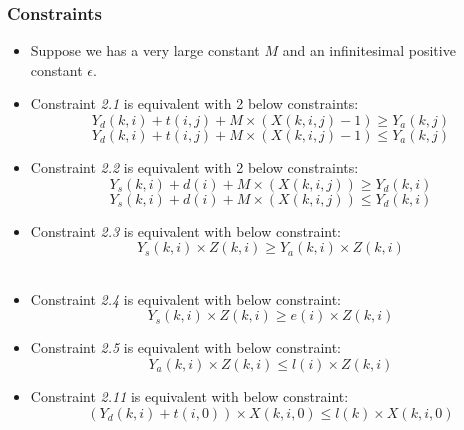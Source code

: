 \subsubsection{Constraints}
	\begin{itemize}
		\item Suppose we has a very large constant $M$ and an infinitesimal positive constant $\epsilon$.
		\item Constraint \emph{2.1} is equivalent with 2 below constraints:
		\begin{equation}
			Y_{d}(k, i) + t(i, j) + M \times (X(k, i, j) - 1) \geq Y_{a}(k, j)
		\end{equation}
		\begin{equation}
			Y_{d}(k, i) + t(i, j) + M \times (X(k, i, j) - 1) \leq Y_{a}(k, j)
		\end{equation}
		\item Constraint \emph{2.2} is equivalent with 2 below constraints:
		\begin{equation}
			Y_{s}(k, i) + d(i) + M \times (X(k, i, j)) \geq Y_{d}(k, i)
		\end{equation}
		\begin{equation}
			Y_{s}(k, i) + d(i) + M \times (X(k, i, j)) \leq Y_{d}(k, i)
		\end{equation}
		\item Constraint \emph{2.3} is equivalent with below constraint:
		\begin{equation}
			Y_{s}(k, i) \times Z(k, i) \geq Y_{a}(k, i) \times Z(k, i) 
		\end{equation}\
		\item Constraint \emph{2.4} is equivalent with below constraint:
		\begin{equation}
			Y_{s}(k, i) \times Z(k, i) \geq e(i) \times Z(k, i)
		\end{equation}
		\item Constraint \emph{2.5} is equivalent with below constraint:
		\begin{equation}
			Y_{a}(k, i) \times Z(k, i) \leq l(i) \times Z(k, i)
		\end{equation}
		\item Constraint \emph{2.11} is equivalent with below constraint:
		\begin{equation}
			(Y_{d}(k, i) + t(i, 0)) \times X(k, i, 0) \leq l(k) \times X(k, i, 0)
		\end{equation}
	\end{itemize}
